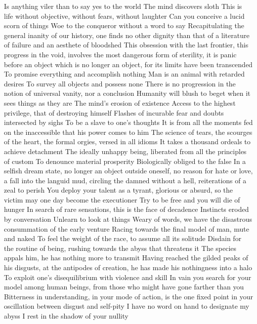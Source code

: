 \documentclass{article}
\begin{document}
Is anything viler than to say yes to the world
The mind discovers sloth
This is life without objective, without fears, without laughter
Can you conceive a lucid scorn of things
Woe to the conqueror without a word to say
Recapitulating the general inanity of our history, one finds no other dignity than that of a literature of failure and an aesthete of bloodshed
This obsession with the last frontier, this progress in the void, involves the most dangerous form of sterility, it is panic before an object which is no longer an object, for its limits have been transcended
To promise everything and accomplish nothing
Man is an animal with retarded desires
To survey all objects and possess none
There is no progression in the notion of universal vanity, nor a conclusion
Humanity will blush to beget when it sees things as they are
The mind's erosion of existence
Access to the highest privilege, that of destroying himself
Flashes of incurable fear and doubts intersected by sighs
To be a slave to one's thoughts
It is from all the moments fed on the inaccessible that his power comes to him
The science of tears, the scourges of the heart, the formal orgies, versed in all idioms
It takes a thousand ordeals to achieve detachment
The ideally unhappy being, liberated from all the principles of custom
To denounce material prosperity
Biologically obliged to the false
In a selfish dream state, no longer an object outside oneself, no reason for hate or love, a fall into the languid mud, circling the damned without a hell, reiterations of a zeal to perish
You deploy your talent as a tyrant, glorious or absurd, so the victim may one day become the executioner
Try to be free and you will die of hunger
In search of rare sensations, this is the face of decadence
Instincts eroded by conversation
Unlearn to look at things
Weary of words, we have the disastrous consummation of the early venture
Racing towards the final model of man, mute and naked
To feel the weight of the race, to assume all its solitude
Disdain for the routine of being, rushing towards the abyss that threatens it
The species appals him, he has nothing more to transmit
Having reached the gilded peaks of his disgusts, at the antipodes of creation, he has made his nothingness into a halo
To exploit one's disequilibrium with violence and skill
In vain you search for your model among human beings, from those who might have gone farther than you
Bitterness in understanding, in your mode of action, is the one fixed point in your oscillation between disgust and self-pity
I have no word on hand to designate my abyss
I rest in the shadow of your nullity
\end{document}

